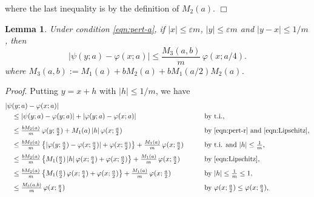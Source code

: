 \documentclass[a4paper,12pt]{article}
\theoremstyle{plain}
\newtheorem{lemma}[theorem]{Lemma}
\def\ve{\varepsilon}
\def\ts{\textstyle}
\begin{document}
where the last inequality is by the definition of 
$M_2(a)$. \hfill $\Box$ 
\begin{lemma} \label{lem:approxi} 
Under condition \eqref{eqn:pert-a}, if $|x| \le \ve m$, $|y| \le \ve m$ 
and $|y-x| \le 1/m$, then    
\begin{equation} \label{eqn:approxi}
| \psi(y; a) - \varphi(x; a) | \le \frac{M_3(a, b)}{m} \, \varphi(x; a/4 ).    
\end{equation}
where $M_3(a, b) := M_1(a) + b M_2(a) + b M_1( a/2 ) M_2( a )$.
\end{lemma}
{\it Proof}.  Putting $y = x + h$ with $|h| \le 1/m$, we have   
\begin{alignat*}{2}
| \psi & ( y; a ) - \varphi( x; a ) | & 
&  \\
& \le | \psi( y; a ) - \varphi( y; a ) | + 
| \varphi( y; a ) - \varphi( x; a ) | 
\qquad & & \mbox{by t.i.,} \\[1mm]
& \le \ts \frac{b M_2(a)}{m} \, \varphi( y; \frac{a}{2} ) 
+ M_1(a) \, |h| \, \varphi( x; \frac{a}{2} ) 
\qquad & & \mbox{by \eqref{eqn:pert-r} and \eqref{eqn:Lipschitz},} \\[1mm]
& \le \ts \frac{b M_2(a)}{m}  
\left\{ |\varphi( y; \frac{a}{2} ) - \varphi( x; \frac{a}{2} ) | + 
\varphi( x; \frac{a}{2} ) \right\} 
+ \ts \frac{M_1(a)}{m} \, \varphi( x; \frac{a}{2} ) 
\qquad & & \mbox{by t.i. and $|h| \le \frac{1}{m}$,} \\[1mm]
& \le \ts \frac{b M_2(a)}{m} \left\{ M_1( \frac{a}{2} ) \, |h| \,   
\varphi( x; \frac{a}{4} ) + \varphi( x; \frac{a}{2} ) \right\} 
+ \ts \frac{M_1(a)}{m} \, \varphi( x; \frac{a}{2} )  
\qquad & & \mbox{by \eqref{eqn:Lipschitz},} \\[1mm]
& \le \ts \frac{b M_2(a)}{m} \left\{ M_1( \frac{a}{2} ) \,    
\varphi( x; \frac{a}{4} ) + \varphi( x; \frac{a}{2} ) \right\} 
+ \ts \frac{M_1(a)}{m} \, \varphi( x; \frac{a}{2} )  
\qquad & & \mbox{by $|h| \le \frac{1}{m} \le 1$,} \\[1mm]
& \le \ts \frac{M_3(a, b )}{m} \, \varphi( x; \frac{a}{4} ) 
\qquad & & \mbox{by $\varphi(x; \frac{a}{2}) \le \varphi(x; \frac{a}{4})$,} 
\end{alignat*}
\end{document}
